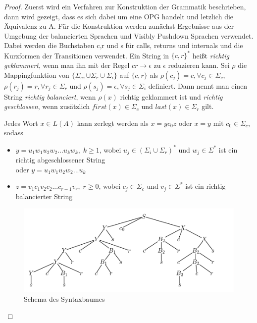 \begin{proof}
Zuerst wird ein Verfahren zur Konstruktion der Grammatik beschrieben, dann wird gezeigt, dass es sich dabei um eine OPG handelt und letzlich die Äquivalenz zu A.
Für die Konstruktion werden zunächst Ergebnisse aus der Umgebung der balancierten Sprachen und Visibly Pushdown Sprachen verwendet. Dabei werden die Buchstaben c,r und s für calls, returns und internals und die Kurzformen der Transitionen verwendet. Ein String in $\{c, r\}^*$ heißt \textit{richtig geklammert}, wenn man ihn mit der Regel $cr \rightarrow \epsilon$ zu $\epsilon$ reduzieren kann. Sei $\rho$ die Mappingfunktion von $\{\Sigma_c, \cup \Sigma_r \cup \Sigma_i\}$ auf $\{c,r\}$ als $\rho(c_j)=c, \forall c_j\in \Sigma_c$, $\rho(r_j)=r, \forall r_j\in \Sigma_r$ und $\rho(s_j)=\epsilon, \forall s_j\in \Sigma_i$ definiert. Dann nennt man einen String \textit{richtig balanciert}, wenn $\rho(x)$ richtig geklammert ist und \textit{richtig geschlossen}, wenn zusätzlich $first(x) \in \Sigma_c$ und $last(x)\in \Sigma_r$ gilt.
\begin{lemma}
\label{factorize}
Jedes Wort $x\in L(A)$ kann zerlegt werden als $x=yc_0z$ oder $x=y$ mit $c_0\in \Sigma_c$, sodass
\begin{itemize}

\item
$y=u_1w_1u_2w_2...u_kw_k, \; k \geq 1$, wobei $u_j \in (\Sigma_i \cup \Sigma_r)^*$ und $w_j \in \Sigma^*$ ist ein richtig abgeschlossener String \\
oder $y=u_1w_1u_2w_2...u_k$
\item
$z=v_1c_1v_2c_2...c_{r-1}v_r, \; r\geq 0$, wobei $c_j \in \Sigma_c$ und $v_j \in \Sigma^*$ ist ein richtig balancierter String
\end{itemize}
\begin{figure}
\centering
\includegraphics[scale=0.7]{sections/vpl_graph}
\caption{Schema des Syntaxbaumes}
\label{schema_tree}
\end{figure}
\end{lemma}


\end{proof}
